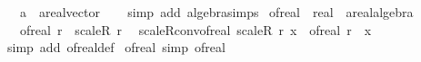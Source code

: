 \begin{isabellebody}
\ \ \ a\ {\isacharcolon}{\kern0pt}{\isacharcolon}{\kern0pt}\ {\isachardoublequoteopen}{\isacharprime}{\kern0pt}a{\isacharcolon}{\kern0pt}{\isacharcolon}{\kern0pt}real{\isacharunderscore}{\kern0pt}vector{\isachardoublequoteclose}\isanewline
%
\isadelimproof
\ \ %
\endisadelimproof
%
\isatagproof
{}\isamarkupfalse%
\ {\isacharparenleft}{\kern0pt}simp\ add{\isacharcolon}{\kern0pt}\ algebra{\isacharunderscore}{\kern0pt}simps{\isacharparenright}{\kern0pt}%
\endisatagproof
{\isafoldproof}%
%
\isadelimproof
%
\endisadelimproof
%
\isadelimdocument
%
\endisadelimdocument
%
\isatagdocument
%
\isamarkuptrue%
%
\endisatagdocument
{\isafolddocument}%
%
\isadelimdocument
%
\endisadelimdocument
{}\isamarkupfalse%
\ of{\isacharunderscore}{\kern0pt}real\ {\isacharcolon}{\kern0pt}{\isacharcolon}{\kern0pt}\ {\isachardoublequoteopen}real\ {\isasymRightarrow}\ {\isacharprime}{\kern0pt}a{\isacharcolon}{\kern0pt}{\isacharcolon}{\kern0pt}real{\isacharunderscore}{\kern0pt}algebra{\isacharunderscore}{\kern0pt}{}{\isachardoublequoteclose}\isanewline
\ \ \ {\isachardoublequoteopen}of{\isacharunderscore}{\kern0pt}real\ r\ {\isacharequal}{\kern0pt}\ scaleR\ r\ {}{\isachardoublequoteclose}\isanewline
\isanewline
{}\isamarkupfalse%
\ scaleR{\isacharunderscore}{\kern0pt}conv{\isacharunderscore}{\kern0pt}of{\isacharunderscore}{\kern0pt}real{\isacharcolon}{\kern0pt}\ {\isachardoublequoteopen}scaleR\ r\ x\ {\isacharequal}{\kern0pt}\ of{\isacharunderscore}{\kern0pt}real\ r\ {\isacharasterisk}{\kern0pt}\ x{\isachardoublequoteclose}\isanewline
%
\isadelimproof
\ \ %
\endisadelimproof
%
\isatagproof
{}\isamarkupfalse%
\ {\isacharparenleft}{\kern0pt}simp\ add{\isacharcolon}{\kern0pt}\ of{\isacharunderscore}{\kern0pt}real{\isacharunderscore}{\kern0pt}def{\isacharparenright}{\kern0pt}%
\endisatagproof
{\isafoldproof}%
%
\isadelimproof
\isanewline
%
\endisadelimproof
\isanewline
{}\isamarkupfalse%
\ of{\isacharunderscore}{\kern0pt}real{\isacharunderscore}{\kern0pt}{}\ {\isacharbrackleft}{\kern0pt}simp{\isacharbrackright}{\kern0pt}{\isacharcolon}{\kern0pt}\ {\isachardoublequoteopen}of{\isacharunderscore}{\kern0pt}real\ {}\ {\isacharequal}{\kern0pt}\ {}{\isachardoublequoteclose}\isanewline
%
\isadelimproof
\ \ %
\endisadelimproof
%
\isatagproof

\end{isabellebody}
